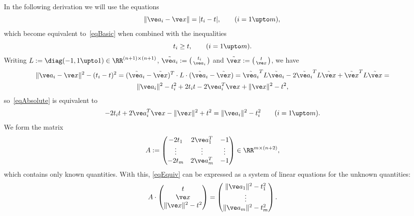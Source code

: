 \documentclass[reqno]{amsart}
\begin{document}
In the following derivation we will use the equations
\begin{equation} \label{eqAbsolute}%
  \lVert\ve a_i - \ve x\rVert = |t_i - t|, \qquad (i = 1 \upto m), \\
\end{equation}
which become equivalent to~\eqref{eqBasic} when combined with the
inequalities
\begin{equation} \label{eqIneq}%
  t_i \ge t, \qquad (i = 1 \upto m).
\end{equation}
Writing $L := \diag(-1,1 \upto 1) \in \RR^{(n+1) \times (n+1)}$,
$\tilde{\ve a_i} := \left(\begin{smallmatrix} t_i \\ \ve
    a_i\end{smallmatrix}\right)$ and
$\tilde{\ve x} := \left(\begin{smallmatrix} t \\ \ve
    x\end{smallmatrix}\right)$, we have
\begin{multline*}
  \lVert\ve a_i - \ve x\rVert^2 - (t_i - t)^2 = (\tilde{\ve a_i} -
  \tilde{\ve x})^T \cdot L \cdot (\tilde{\ve a_i} - \tilde{\ve x}) =
  \tilde{\ve a_i}^T L \tilde{\ve a_i} - 2 \tilde{\ve a_i}^T L \tilde{\ve
    x} + \tilde{\ve x}^T L \tilde{\ve x} = \\
  \lVert\ve a_i\rVert^2 - t_i^2 + 2 t_i t - 2 \ve a_i^T \ve x +
  \lVert\ve x\rVert^2 - t^2,
\end{multline*}
so~\eqref{eqAbsolute} is equivalent to
\begin{equation} \label{eqEquiv}%
  - 2 t_i t + 2 \ve a_i^T \ve x - \lVert\ve x\rVert^2 + t^2 =
  \lVert\ve a_i\rVert^2 - t_i^2 \qquad (i = 1 \upto m).
\end{equation}
We form the matrix
\begin{equation} \label{eqA}%
  A :=
  \begin{pmatrix}
    - 2 t_1 & 2 \ve a_1^T & -1 \\
    \vdots & \vdots & \vdots \\
    -2 t_m & 2 \ve a_m^T & -1
  \end{pmatrix} \in \RR^{m \times (n+2)},
\end{equation}
which contains only known quantities. With this, \eqref{eqEquiv} can
be expressed as a system of linear equations for the unknown
quantities:
\begin{equation} \label{eqMatrix}%
  A \cdot
  \begin{pmatrix}
    t \\
    \ve x \\
    \lVert\ve x\rVert^2 - t^2
  \end{pmatrix} =
  \begin{pmatrix}
    \lVert\ve a_1\rVert^2 - t_1^2 \\
    \vdots \\
    \lVert\ve a_m\rVert^2 - t_m^2
  \end{pmatrix}.
\end{equation}
\end{document}
